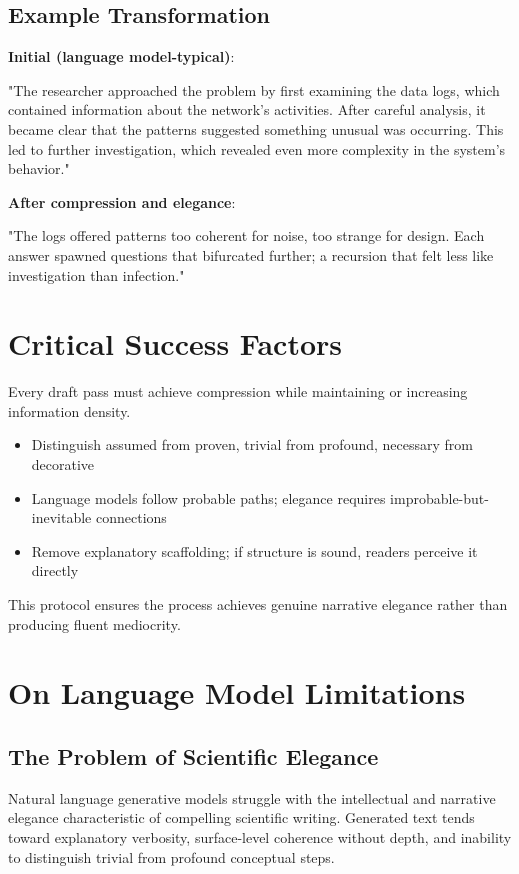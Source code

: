 \subsection*{Example Transformation}

\textbf{Initial (language model-typical)}:

"The researcher approached the problem by first examining the data logs, which contained information about the network's activities. After careful analysis, it became clear that the patterns suggested something unusual was occurring. This led to further investigation, which revealed even more complexity in the system's behavior."

\textbf{After compression and elegance}:

"The logs offered patterns too coherent for noise, too strange for design. Each answer spawned questions that bifurcated further; a recursion that felt less like investigation than infection."

\section*{Critical Success Factors}

Every draft pass must achieve compression while maintaining or increasing information density. 

\begin{itemize}
\item Distinguish assumed from proven, trivial from profound, necessary from decorative
\item Language models follow probable paths; elegance requires improbable-but-inevitable connections
\item Remove explanatory scaffolding; if structure is sound, readers perceive it directly
\end{itemize}

This protocol ensures the process achieves genuine narrative elegance rather than producing fluent mediocrity.

\section*{On Language Model Limitations}

\subsection*{The Problem of Scientific Elegance}

Natural language generative models struggle with the intellectual and narrative elegance characteristic of compelling scientific writing. Generated text tends toward explanatory verbosity, surface-level coherence without depth, and inability to distinguish trivial from profound conceptual steps.


